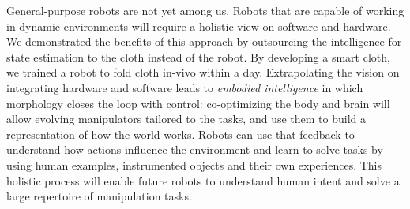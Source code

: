 \documentclass[\home/main.tex]{subfiles}
\begin{document}
General-purpose robots are not yet among us. Robots that are capable of working in dynamic environments will require a holistic view on software and hardware. 
We demonstrated the benefits of this approach by outsourcing the intelligence for state estimation to the cloth instead of the robot. By developing a smart cloth, we trained a robot to fold cloth in-vivo within a day.  
Extrapolating the vision on integrating hardware and software leads to \emph{embodied intelligence} in which morphology closes the loop with control: co-optimizing the body and brain will allow evolving manipulators tailored to
the tasks, and use them to build a representation of how the world works. 
Robots can use that feedback to understand how actions influence the environment and learn to solve tasks by using human examples, instrumented objects and their own experiences.
This holistic process will enable future robots to understand human intent and solve a large repertoire of manipulation tasks. 




\glsresetall
\end{document}

